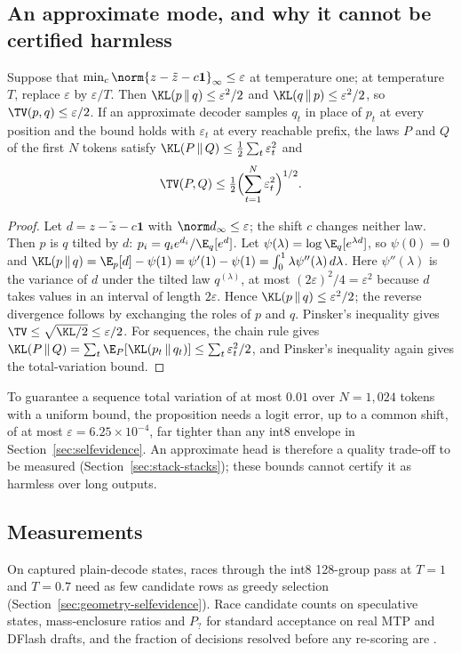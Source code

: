 \subsection{An approximate mode, and why it cannot be certified harmless}\label{sec:approx-mode}
\begin{proposition}\label{prop:kl}
Suppose that $\min_c\norm{z-\tilde z-c\mathbf 1}_\infty\le\varepsilon$ at temperature one; at temperature $T$, replace $\varepsilon$ by $\varepsilon/T$. Then $\KL(p\,\|\,q)\le\varepsilon^2/2$ and $\KL(q\,\|\,p)\le\varepsilon^2/2$, so $\TV(p,q)\le\varepsilon/2$. If an approximate decoder samples $q_t$ in place of $p_t$ at every position and the bound holds with $\varepsilon_t$ at every reachable prefix, the laws $P$ and $Q$ of the first $N$ tokens satisfy $\KL(P\,\|\,Q)\le\tfrac12\sum_t\varepsilon_t^2$ and
\[\TV(P,Q)\le\tfrac12\Bigl(\sum_{t=1}^N\varepsilon_t^2\Bigr)^{1/2}.\]
\end{proposition}
\begin{proof}
Let $d=z-\tilde z-c\mathbf 1$ with $\norm d_\infty\le\varepsilon$; the shift $c$ changes neither law. Then $p$ is $q$ tilted by $d$: $p_i=q_ie^{d_i}/\E_q[e^d]$. Let $\psi(\lambda)=\log\E_q[e^{\lambda d}]$, so $\psi(0)=0$ and $\KL(p\,\|\,q)=\E_p[d]-\psi(1)=\psi'(1)-\psi(1)=\int_0^1\lambda\psi''(\lambda)\,d\lambda$. Here $\psi''(\lambda)$ is the variance of $d$ under the tilted law $q^{(\lambda)}$, at most $(2\varepsilon)^2/4=\varepsilon^2$ because $d$ takes values in an interval of length $2\varepsilon$. Hence $\KL(p\,\|\,q)\le\varepsilon^2/2$; the reverse divergence follows by exchanging the roles of $p$ and $q$. Pinsker's inequality gives $\TV\le\sqrt{\KL/2}\le\varepsilon/2$. For sequences, the chain rule gives $\KL(P\,\|\,Q)=\sum_t\E_P[\KL(p_t\,\|\,q_t)]\le\sum_t\varepsilon_t^2/2$, and Pinsker's inequality again gives the total-variation bound.
\end{proof}
To guarantee a sequence total variation of at most $0.01$ over $N=1{,}024$ tokens with a uniform bound, the proposition needs a logit error, up to a common shift, of at most $\varepsilon=6.25\times10^{-4}$, far tighter than any int8 envelope in Section~\ref{sec:selfevidence}. An approximate head is therefore a quality trade-off to be measured (Section~\ref{sec:stack-stacks}); these bounds cannot certify it as harmless over long outputs.

\subsection{Measurements}\label{sec:decisions-measured}
On captured plain-decode states, races through the int8 128-group pass at $T=1$ and $T=0.7$ need as few candidate rows as greedy selection (Section~\ref{sec:geometry-selfevidence}). Race candidate counts on speculative states, mass-enclosure ratios and $P_?$ for standard acceptance on real MTP and DFlash drafts, and the fraction of decisions resolved before any re-scoring are .
